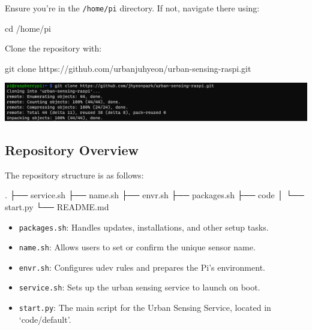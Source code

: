 \documentclass[
  letterpaper,
]{scrbook}
\newenvironment{Shaded}{\begin{snugshade}}{\end{snugshade}}
\newcommand{\BuiltInTok}[1]{\textcolor[rgb]{0.00,0.23,0.31}{#1}}
\newcommand{\ExtensionTok}[1]{\textcolor[rgb]{0.00,0.23,0.31}{#1}}
\newcommand{\FunctionTok}[1]{\textcolor[rgb]{0.28,0.35,0.67}{#1}}
\newcommand{\NormalTok}[1]{\textcolor[rgb]{0.00,0.23,0.31}{#1}}
\providecommand{\tightlist}{%
  \setlength{\itemsep}{0pt}\setlength{\parskip}{0pt}}\usepackage{longtable,booktabs,array}
\begin{document}
Ensure you're in the \texttt{/home/pi} directory. If not, navigate there
using:

\begin{Shaded}
\begin{Highlighting}[]
\BuiltInTok{cd}\NormalTok{ /home/pi}
\end{Highlighting}
\end{Shaded}

Clone the repository with:

\begin{Shaded}
\begin{Highlighting}[]
\FunctionTok{git}\NormalTok{ clone https://github.com/urbanjuhyeon/urban{-}sensing{-}raspi.git}
\end{Highlighting}
\end{Shaded}

\includegraphics{content/material/ch2/clone_raspi.png}

\subsection*{Repository Overview}\label{repository-overview}

The repository structure is as follows:

\begin{Shaded}
\begin{Highlighting}[]
\BuiltInTok{.}
\ExtensionTok{├──}\NormalTok{ service.sh}
\ExtensionTok{├──}\NormalTok{ name.sh}
\ExtensionTok{├──}\NormalTok{ envr.sh}
\ExtensionTok{├──}\NormalTok{ packages.sh}
\ExtensionTok{├──}\NormalTok{ code}
\ExtensionTok{│}\NormalTok{   └── start.py}
\ExtensionTok{└──}\NormalTok{ README.md}
\end{Highlighting}
\end{Shaded}

\begin{itemize}
\tightlist
\item
  \texttt{packages.sh}: Handles updates, installations, and other setup
  tasks.
\item
  \texttt{name.sh}: Allows users to set or confirm the unique sensor
  name.
\item
  \texttt{envr.sh}: Configures udev rules and prepares the Pi's
  environment.
\item
  \texttt{service.sh}: Sets up the urban sensing service to launch on
  boot.
\item
  \texttt{start.py}: The main script for the Urban Sensing Service,
  located in `code/default'.
\end{itemize}
\end{document}
